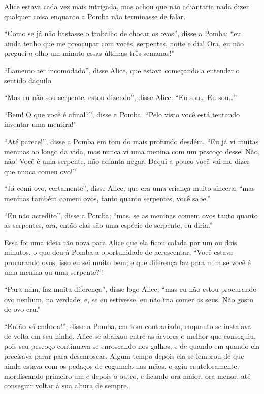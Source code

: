 Alice estava cada vez mais intrigada, mas achou que não adiantaria nada
dizer qualquer coisa enquanto a Pomba não terminasse de falar.

``Como se já não bastasse o trabalho de chocar os ovos'', disse a Pomba;
``eu ainda tenho que me preocupar com vocês, serpentes, noite e dia!
Ora, eu não preguei o olho um minuto essas últimas três semanas!''

``Lamento ter incomodado'', disse Alice, que estava começando a entender
o sentido daquilo.


``Mas eu não sou serpente, estou dizendo'', disse Alice. ``Eu sou\ldots{} Eu
sou\ldots{}''

``Bem! O que você é afinal?'', disse a Pomba. ``Pelo visto você está
tentando inventar uma mentira!''


``Até parece!'', disse a Pomba em tom do mais profundo desdém. ``Eu já
vi muitas meninas ao longo da vida, mas nunca vi uma menina com um
pescoço desse! Não, não! Você é uma serpente, não adianta negar. Daqui a
pouco você vai me dizer que nunca comeu ovo!''

``Já comi ovo, certamente'', disse Alice, que era uma criança muito
sincera; ``mas meninas também comem ovos, tanto quanto serpentes, você
sabe.''

``Eu não acredito'', disse a Pomba; ``mas, se as meninas comem ovos
tanto quanto as serpentes, ora, então elas são uma espécie de serpente,
eu diria.''

Essa foi uma ideia tão nova para Alice que ela ficou calada por um ou
dois minutos, o que deu à Pomba a oportunidade de acrescentar: ``Você
estava procurando ovos, isso eu sei muito bem; e que diferença faz para
mim se você é uma menina ou uma serpente?''.

``Para mim, faz muita diferença'', disse logo Alice; ``mas eu não estou
procurando ovo nenhum, na verdade; e, se eu estivesse, eu não iria comer
os seus. Não gosto de ovo cru.''

``Então vá embora!'', disse a Pomba, em tom contrariado, enquanto se
instalava de volta em seu ninho. Alice se abaixou entre as árvores o
melhor que conseguiu, pois seu pescoço continuava se enroscando nos
galhos, e de quando em quando ela precisava parar para desenroscar.
Algum tempo depois ela se lembrou de que ainda estava com os pedaços de
cogumelo nas mãos, e agiu cautelosamente, mordiscando primeiro um e
depois o outro, e ficando ora maior, ora menor, até conseguir voltar à
sua altura de sempre.

